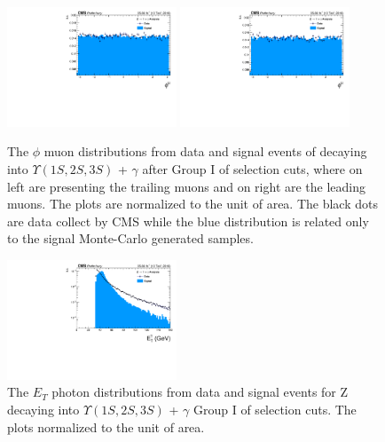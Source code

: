 \begin{figure}[!htbp]
\begin{center}
\includegraphics[width=0.45\textwidth]{figures_and_tables/outputPlots/ZtoUpsilon_Cat0_ZZZZZ/au/data_x_mc/noKinCuts/h_noKin_TrailingMu_phi}\hspace*{1.cm}
\includegraphics[width=0.45\textwidth]{figures_and_tables/outputPlots/ZtoUpsilon_Cat0_ZZZZZ/au/data_x_mc/noKinCuts/h_noKin_LeadingMu_phi}
\end{center}\vspace*{-.5cm}
\caption{The $\phi$ muon distributions from data and signal events of \Z decaying into $\Upsilon(1S,2S,3S)$ + $\gamma$ after Group I of selection cuts, where on left are presenting the trailing muons and on right are the leading muons. The plots are normalized to the unit of area. The black dots are data collect by CMS while the blue distribution is related only to the signal Monte-Carlo generated samples.}
\label{fig:phiMuons_ZtoUpsilon_Cat0}
\end{figure}


\begin{figure}[!htbp]
\begin{center}
\includegraphics[width=0.45\textwidth]{figures_and_tables/outputPlots/ZtoUpsilon_Cat0_ZZZZZ/au/data_x_mc/noKinCuts/h_noKin_Photon_pt}\hspace*{1.cm}
\end{center}\vspace*{-.5cm}
\caption{The $E_{T}$ photon distributions from data and signal events for Z decaying into $\Upsilon(1S,2S,3S)$ + $\gamma$ Group I of selection cuts. The plots normalized to the unit of area.}
\label{fig:pTPhoton_ZtoUpsilon_Cat0}
\end{figure}


